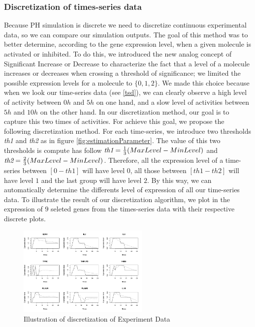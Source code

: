 \subsubsection{Discretization of times-series data}

Because PH simulation is discrete we need to discretize continuous experimental data, so we can compare our simulation outputs.
The goal of this method was to better determine, according to the gene expression level, when  a given molecule is activated or inhibited.
To do this, we introduced the new analog concept of Significant Increase or Decrease to characterize the fact that a level of a molecule 
increases or decreases when crossing a threshold of significance; we limited the possible expression levels for a molecule to
$\{0, 1, 2\}$. We made this choice because when we look our time-series data (see \ref{tsd}), we can clearly observe a high level of
activity between $0h$ and $5h$ on one hand, and a slow level of activities between $5h$ and $10h$ on the other hand. In our discretization
method, our goal is to capture this two times of activities. For achieve this goal, we propose the following discretization method.
For each time-series, we introduce two thresholds \emph{th1} and \emph{th2} as in figure \ref{fig:estimationParameter}. The value of this two
thresholds is compute has follow $\emph{th1}=\frac{1}{3}(MaxLevel-MinLevel)$ and $\emph{th2}=\frac{2}{3}(MaxLevel-MinLevel)$. Therefore, all
the expression level of a time-series between $[0-th1]$ will have level $0$, all those between $[th1-th2]$ will have level $1$ and the last group will
have level $2$. By this way, we can automatically determine the differents level of expression of all our time-series data. 
To illustrate the result of our discretization algorithm, we plot in  the expression 
of $9$ seleted genes from the times-series data with their respective discrete plots. 

\begin{figure}[!t]
 \centering
 \includegraphics[width=2.5in]{images/ResultDiscretization.png}
 \caption{Illustration of discretization of Experiment Data }
 \label{fig:illustrationDiscretisation}
\end{figure}

